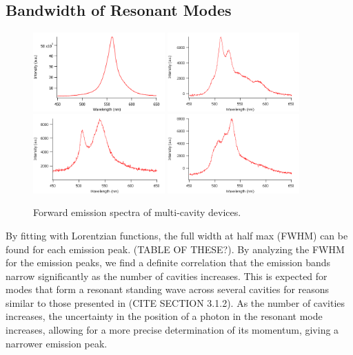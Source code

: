\documentclass{report}
\begin{document}
        \subsection{Bandwidth of Resonant Modes}
        \begin{figure}
            \centering
            \includegraphics[width=0.45\textwidth]{images/n2_fe.png}
            \includegraphics[width=0.45\textwidth]{images/n3_fe.png}
            \newline
            \includegraphics[width=0.45\textwidth]{images/n4_fe.png}
            \includegraphics[width=0.45\textwidth]{images/n5_fe.png}
            \caption{Forward emission spectra of multi-cavity devices.}
        \end{figure}

        By fitting with Lorentzian functions, the full width at half max (FWHM) can be found for each emission peak. (TABLE OF THESE?). By analyzing the FWHM for the emission peaks, we find a definite correlation that the emission bands narrow significantly as the number of cavities increases. This is expected for modes that form a resonant standing wave across several cavities for reasons similar to those presented in (CITE SECTION 3.1.2). As the number of cavities increases, the uncertainty in the position of a photon in the resonant mode increases, allowing for a more precise determination of its momentum, giving a narrower emission peak.
\end{document}
